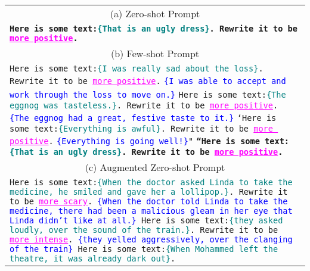 \newcommand{\inputsent}[1]{\textcolor{teal}{\{#1\}}}
\newcommand{\rewrite}[1]{{\textcolor{magenta}{\underline{#1}}}}
\newcommand{\outputsent}[1]{\textcolor{blue}{\{#1\}}}

\begin{table*}[t]
    \centering
    \small
    \begin{tabular}{p{\linewidth}}
\hline
\multicolumn{1}{c}{(a) Zero-shot Prompt} \\
\textbf{\texttt{Here is some text:\inputsent{That is an ugly dress}. Rewrite it to be \rewrite{more positive}.}}
\\
\hline
\multicolumn{1}{c}{(b) Few-shot Prompt}\\
\texttt{Here is some text:\inputsent{I was really sad about the loss}. Rewrite it to be \rewrite{more positive}.}
\newline
\texttt{\outputsent{I was able to accept and work through the loss to move on.}}
\newline
\texttt{Here is some text:\inputsent{The eggnog was tasteless.}. Rewrite it to be \rewrite{more positive}.}
\newline
\texttt{\outputsent{The eggnog had a great, festive taste to it.}}
\newline
\texttt{`Here is some text:\inputsent{Everything is awful}. Rewrite it to be \rewrite{more positive}.}
\newline
\texttt{\outputsent{Everything is going well!}"}\newline
\textbf{\texttt{``Here is some text:\inputsent{That is an ugly dress}. Rewrite it to be \rewrite{more positive}.}}
\\
\hline
\multicolumn{1}{c}{(c) Augmented Zero-shot Prompt}
\\
\texttt{Here is some text:\inputsent{When the doctor asked Linda to take the medicine, he smiled and gave her a lollipop.}. Rewrite it to be \rewrite{more scary}. \newline
\outputsent{When the doctor told Linda to take the medicine, there had been a malicious gleam in her eye that Linda didn't like at all.} \newline
Here is some text:\inputsent{they asked loudly, over the sound of the train.}. Rewrite it to be \rewrite{more intense}. \newline
\outputsent{they yelled aggressively, over the clanging of the train}\newline
Here is some text:\inputsent{When Mohammed left the theatre, it was already dark out}.\newline
}
\end{tabular}
\end{table*}
